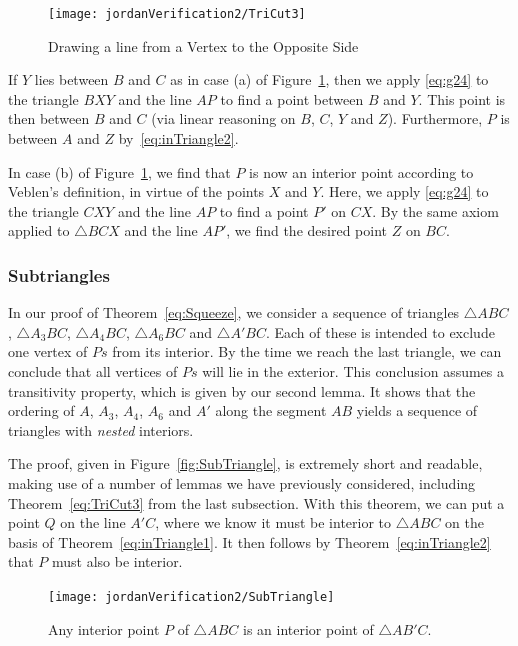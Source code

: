 \begin{figure}
\centering\texttt{[image: jordanVerification2/TriCut3]}
\caption{Drawing a line from a Vertex to the Opposite Side}
\label{fig:TriCut3}
\end{figure}

If $Y$ lies between $B$ and $C$ as in case (a) of Figure~\ref{fig:TriCut3}, then we apply \eqref{eq:g24} to the triangle $BXY$ and the line $AP$ to find a point between $B$ and $Y$. This point is then between $B$ and $C$ (via linear reasoning on $B$, $C$, $Y$ and $Z$). Furthermore, $P$ is between $A$ and $Z$ by~\eqref{eq:inTriangle2}.

In case (b) of Figure~\ref{fig:TriCut3}, we find that $P$ is now an interior point according to Veblen's definition, in virtue of the points $X$ and $Y$. Here, we apply \eqref{eq:g24} to the triangle $CXY$ and the line $AP$ to find a point $P'$ on $CX$. By the same axiom applied to $\triangle BCX$ and the line $AP'$, we find the desired point $Z$ on $BC$.

\subsubsection{Subtriangles}
In our proof of Theorem~\ref{eq:Squeeze}, we consider a sequence of triangles $\triangle ABC$, $\triangle A_3BC$, $\triangle A_4BC$, $\triangle A_6BC$ and $\triangle A'BC$. Each of these is intended to exclude one vertex of $Ps$ from its interior. By the time we reach the last triangle, we can conclude that all vertices of $Ps$ will lie in the exterior. This conclusion assumes a transitivity property, which is given by our second lemma. It shows that the ordering of $A$, $A_3$, $A_4$, $A_6$ and $A'$ along the segment $AB$ yields a sequence of triangles with \emph{nested} interiors. 

The proof, given in Figure~\ref{fig:SubTriangle}, is extremely short and readable, making use of a number of lemmas we have previously considered, including Theorem~\ref{eq:TriCut3} from the last subsection. With this theorem, we can put a point $Q$ on the line $A'C$, where we know it must be interior to $\triangle ABC$ on the basis of Theorem~\ref{eq:inTriangle1}. It then follows by Theorem~\ref{eq:inTriangle2} that $P$ must also be interior.

\begin{figure}
\centering\texttt{[image: jordanVerification2/SubTriangle]}
\caption{Any interior point $P$ of $\triangle ABC$ is an interior point of $\triangle AB'C$.}
\end{figure}

